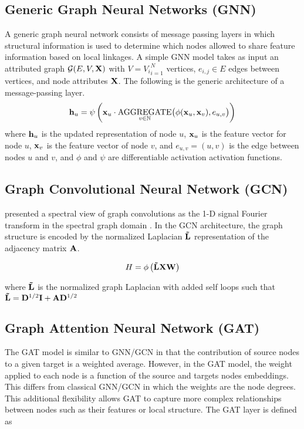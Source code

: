 \documentclass[a4paper,12pt]{article}
\begin{document}
	\subsection{Generic Graph Neural Networks (GNN)}
	A generic graph neural network consists of message passing layers in which structural information is used to determine which nodes allowed to share feature information based on local linkages. A simple GNN model takes as input an attributed graph $\mathcal{G}(E,V, {\bf X})$ with $V={V_i}_{i=1}^N$ vertices, $e_{i,j} \in E$ edges between vertices, and node attributes ${\bf X}$. The following is the generic architecture of a message-passing layer.
	\begin{eqnarray} {\bf h}_u = \psi\left({\bf x}_u \cdot \underset{v\in\mathbb{N}}{\text{AGGREGATE}}\big(\phi({\bf x}_u, {\bf x}_v), e_{u,v}\big)\right) \label{eq:eqn3}\end{eqnarray}
	where ${\bf h}_u$ is the updated representation of node $u$, ${\bf x}_u$ is the feature vector for node $u$, ${\bf x}_v$ is the feature vector of node $v$, and $e_{u,v} = (u,v)$ is the edge between nodes $u$ and $v$, and $\phi$ and $\psi$ are differentiable activation activation functions.
	\subsection{Graph Convolutional Neural Network (GCN)}
	\cite{kipf2016semi} presented a spectral view of graph convolutions as the 1-D signal Fourier transform in the spectral graph domain \cite{zhang2019graph}. In the GCN architecture, the graph structure is encoded by the normalized Laplacian ${\bf \tilde L}$ representation of the adjacency matrix ${\bf A}$.
	
	\[ H = \phi\left({\bf \tilde LXW}\right) \]  
	
	where ${\bf \tilde L}$ is the normalized graph Laplacian with added self loops such that ${\bf \tilde L} = {\bf D}^{1/2}{\bf I + A}{\bf D}^{1/2}$ 
	
	\subsection{Graph Attention Neural Network (GAT)}
	The GAT model is similar to GNN/GCN in that the contribution of source nodes to a given target is a weighted average. However, in the GAT model, the weight applied to each node is a function of the source and targets nodes embeddings. This differs from classical GNN/GCN in which the weights are the node degrees. This additional flexibility allows GAT to capture more complex relationships between nodes such as their features or local structure. The GAT layer is defined as 
	\[ \]
	
\end{document}
